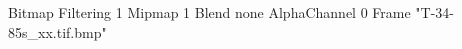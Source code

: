 {Bitmap
	{Filtering 1}
	{Mipmap 1}
	{Blend none}
	{AlphaChannel 0}
	{Frame "T-34-85s_xx.tif.bmp"}
}
